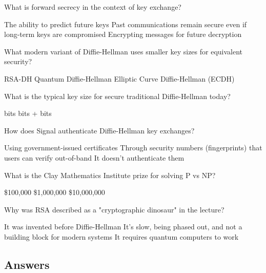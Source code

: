 \documentclass[10pt,a4paper,american]{exam}
\begin{document}
\begin{questions}
	\question What is forward secrecy in the context of key exchange?
	\begin{randomizechoices}
		\choice The ability to predict future keys
		\CorrectChoice Past communications remain secure even if long-term keys are compromised
		\choice Encrypting messages for future decryption
	\end{randomizechoices}

	\question What modern variant of Diffie-Hellman uses smaller key sizes for equivalent security?
	\begin{randomizechoices}
		\choice RSA-DH
		\choice Quantum Diffie-Hellman
		\CorrectChoice Elliptic Curve Diffie-Hellman (ECDH)
	\end{randomizechoices}

	\question What is the typical key size for secure traditional Diffie-Hellman today?
	\begin{randomizechoices}
		 bits
		 bits
		+ bits
	\end{randomizechoices}

	\question How does Signal authenticate Diffie-Hellman key exchanges?
	\begin{randomizechoices}
		\choice Using government-issued certificates
		\CorrectChoice Through security numbers (fingerprints) that users can verify out-of-band
		\choice It doesn't authenticate them
	\end{randomizechoices}

	\question What is the Clay Mathematics Institute prize for solving P vs NP?
	\begin{randomizechoices}
		\choice \$100,000
		\CorrectChoice \$1,000,000
		\choice \$10,000,000
	\end{randomizechoices}

	\question Why was RSA described as a "cryptographic dinosaur" in the lecture?
	\begin{randomizechoices}
		\choice It was invented before Diffie-Hellman
		\CorrectChoice It's slow, being phased out, and not a building block for modern systems
		\choice It requires quantum computers to work
	\end{randomizechoices}

\end{questions}

\clearpage

\subsection*{Answers}
\printkeytable
\end{document}
